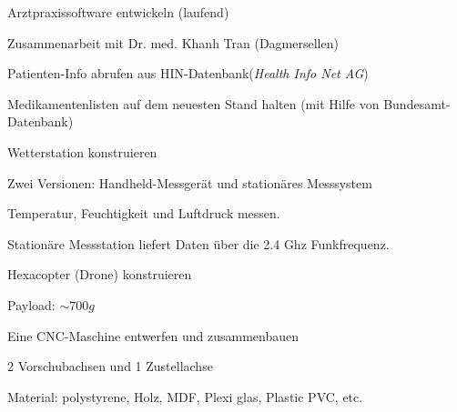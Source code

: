 

\begin{cventries}
	
	\cventry
	{} %
	{Arztpraxissoftware entwickeln (laufend)} %
	{} %
	{} %
	{\vspace{-12pt}
		\begin{cvitems} %
			\item {Zusammenarbeit mit Dr. med. Khanh Tran (Dagmersellen)}
			\item {Patienten-Info abrufen aus HIN-Datenbank(\textit{Health Info Net AG})}
			\item {Medikamentenlisten auf dem neuesten Stand halten (mit Hilfe von Bundesamt-Datenbank)}
		\end{cvitems}
	}
	
	\cventry
	{} %
	{Wetterstation konstruieren} %
	{} %
	{} %
	{\vspace{-12pt}
		\begin{cvitems} %
			\item {Zwei Versionen: Handheld-Messgerät und stationäres Messsystem}
			\item {Temperatur, Feuchtigkeit und Luftdruck messen.}
			\item {Stationäre Messstation liefert Daten über die 2.4 Ghz Funkfrequenz.}
		\end{cvitems}
	}
	
	\cventry
	{} %
	{Hexacopter (Drone) konstruieren} %
	{} %
	{} %
	{\vspace{-12pt}
		\begin{cvitems} %
			\item {Payload: $ \sim 700g$}
		\end{cvitems}
	}
	
	\cventry
	{} %
	{Eine CNC-Maschine entwerfen und zusammenbauen} %
	{} %
	{} %
	{\vspace{-12pt}
		\begin{cvitems} %
			\item {2 Vorschubachsen und 1 Zustellachse}
			\item {Material: polystyrene, Holz, MDF, Plexi glas, Plastic PVC, etc.}
		\end{cvitems}
	}
	
\end{cventries}